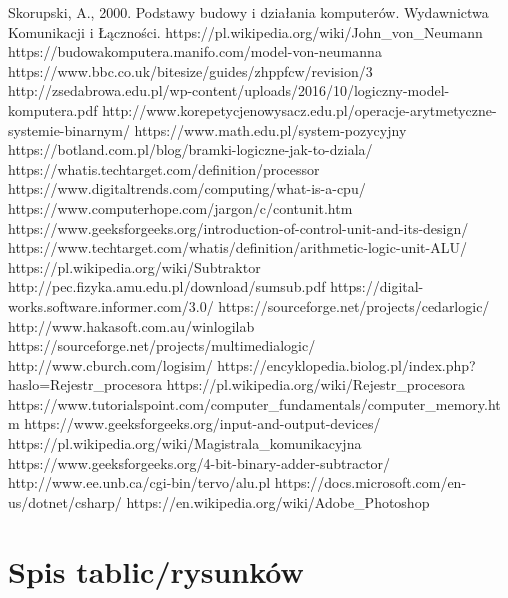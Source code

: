 \documentclass[12pt, a4paper, onside, polish]{article}				%
\begin{document}
\begin{thebibliography}{100}
 Skorupski, A., 2000. Podstawy budowy i działania komputerów. Wydawnictwa Komunikacji i Łączności.
\bibitem{} https://pl.wikipedia.org/wiki/John_von_Neumann 
\bibitem{} https://budowakomputera.manifo.com/model-von-neumanna 
\bibitem{} https://www.bbc.co.uk/bitesize/guides/zhppfcw/revision/3 
\bibitem{} http://zsedabrowa.edu.pl/wp-content/uploads/2016/10/logiczny-model-komputera.pdf 
\bibitem{} http://www.korepetycjenowysacz.edu.pl/operacje-arytmetyczne-systemie-binarnym/
\bibitem{} https://www.math.edu.pl/system-pozycyjny
\bibitem{} https://botland.com.pl/blog/bramki-logiczne-jak-to-dziala/
\bibitem{} https://whatis.techtarget.com/definition/processor
\bibitem{} https://www.digitaltrends.com/computing/what-is-a-cpu/
\bibitem{} https://www.computerhope.com/jargon/c/contunit.htm
\bibitem{} https://www.geeksforgeeks.org/introduction-of-control-unit-and-its-design/
\bibitem{} https://www.techtarget.com/whatis/definition/arithmetic-logic-unit-ALU/
\bibitem{} https://pl.wikipedia.org/wiki/Subtraktor
\bibitem{} http://pec.fizyka.amu.edu.pl/download/sumsub.pdf
\bibitem{} https://digital-works.software.informer.com/3.0/
\bibitem{} https://sourceforge.net/projects/cedarlogic/
\bibitem{} http://www.hakasoft.com.au/winlogilab
\bibitem{} https://sourceforge.net/projects/multimedialogic/
\bibitem{} http://www.cburch.com/logisim/
\bibitem{} https://encyklopedia.biolog.pl/index.php?haslo=Rejestr_procesora
\bibitem{} https://pl.wikipedia.org/wiki/Rejestr_procesora
\bibitem{} https://www.tutorialspoint.com/computer_fundamentals/computer_memory.htm
\bibitem{} https://www.geeksforgeeks.org/input-and-output-devices/
\bibitem{} https://pl.wikipedia.org/wiki/Magistrala_komunikacyjna
\bibitem{} https://www.geeksforgeeks.org/4-bit-binary-adder-subtractor/
\bibitem{} http://www.ee.unb.ca/cgi-bin/tervo/alu.pl
\bibitem{} https://docs.microsoft.com/en-us/dotnet/csharp/
\bibitem{} https://en.wikipedia.org/wiki/Adobe_Photoshop



\end{thebibliography}


\cleardoublepage
\section{Spis tablic/rysunków}
\begin{appendix}
\listoftables
\listoffigures
\end{appendix}

\cleardoublepage
\end{document}
